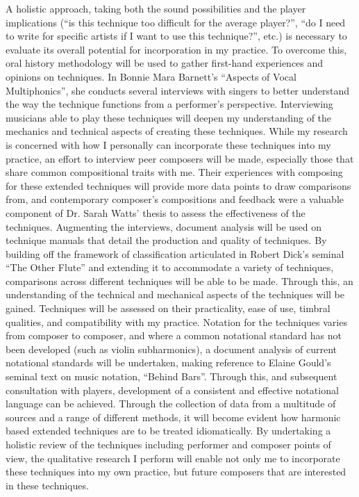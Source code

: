 A holistic approach, taking both the sound possibilities and the player implications (“is this technique too difficult for the average player?”, “do I need to write for specific artists if I want to use this technique?”, etc.) is necessary to evaluate its overall potential for incorporation in my practice. To overcome this, oral history methodology will be used to gather first-hand experiences and opinions on techniques. In Bonnie Mara Barnett’s “Aspects of Vocal Multiphonics”, she conducts several interviews with singers to better understand the way the technique functions from a performer’s perspective.\autocite{barnettAspectsVocalMultiphonics1977} Interviewing musicians able to play these techniques will deepen my understanding of the mechanics and technical aspects of creating these techniques. While my research is concerned with how I personally can incorporate these techniques into my practice, an effort to interview peer composers will be made, especially those that share common compositional traits with me. Their experiences with composing for these extended techniques will provide more data points to draw comparisons from, and contemporary composer’s compositions and feedback were a valuable component of Dr. Sarah Watts’ thesis to assess the effectiveness of the techniques. 
Augmenting the interviews, document analysis will be used on technique manuals that detail the production and quality of techniques. By building off the framework of classification articulated in Robert Dick’s seminal “The Other Flute” and extending it to accommodate a variety of techniques, comparisons across different techniques will be able to be made.\autocite{dickOtherFlute1989}  Through this, an understanding of the technical and mechanical aspects of the techniques will be gained. Techniques will be assessed on their practicality, ease of use, timbral qualities, and compatibility with my practice. Notation for the techniques varies from composer to composer, and where a common notational standard has not been developed (such as violin subharmonics), a document analysis of current notational standards will be undertaken, making reference to Elaine Gould’s seminal text on music notation, “Behind Bars”.\autocite{gouldBars2011} Through this, and subsequent consultation with players, development of a consistent and effective notational language can be achieved.
Through the collection of data from a multitude of sources and a range of different methods, it will become evident how harmonic based extended techniques are to be treated idiomatically. By undertaking a holistic review of the techniques including performer and composer points of view, the qualitative research I perform will enable not only me to incorporate these techniques into my own practice, but future composers that are interested in these techniques.

